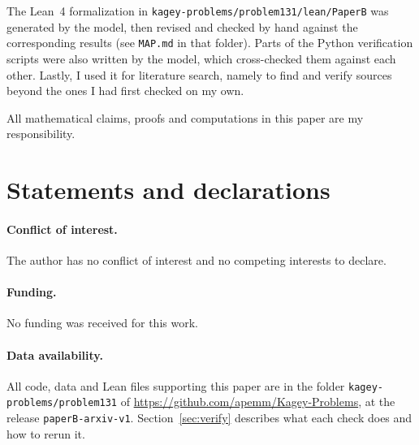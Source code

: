 \documentclass[11pt]{article}
\theoremstyle{definition}
\theoremstyle{remark}
\begin{document}
The Lean~4 formalization in
\nolinkurl{kagey-problems/problem131/lean/PaperB} was generated by the
model, then revised and checked by hand against the corresponding results (see
\nolinkurl{MAP.md} in that folder). Parts of the Python verification scripts
were also written by the model, which cross-checked them against each other.
Lastly, I used it for literature search, namely to find and verify sources
beyond the ones I had first checked on my own.

All mathematical claims, proofs and computations in this paper are my
responsibility.

\appendix





\section*{Statements and declarations}
\paragraph{Conflict of interest.} The author has no conflict of interest and no
competing interests to declare.

\paragraph{Funding.} No funding was received for this work.

\paragraph{Data availability.} All code, data and Lean files supporting this
paper are in the folder \nolinkurl{kagey-problems/problem131} of
\url{https://github.com/apemm/Kagey-Problems}, at the release
\texttt{paperB-arxiv-v1}. Section~\ref{sec:verify} describes what each check
does and how to rerun it.
\end{document}
